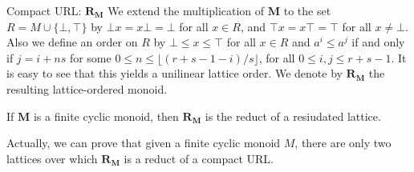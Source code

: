 \documentclass[professionalfont, 12pt]{beamer} %
\theoremstyle{plain}
\theoremstyle{definition}
\newcommand{\m}[1]{{\mathbf {#1} }}
\begin{document}
\begin{frame}{Compact URL: $\m R_{\m M}$}
    We extend the multiplication of $\m M$ to the set $R = M \cup \{\bot, \top\}$ by $\bot x = x \bot = \bot$ for all $x \in R$, and $\top x = x \top = \top$ for all $x \not = \bot$.
    Also we define an order on $R$ by $\bot \leq x \leq \top$ for all $x \in R$ and
    $a^i \leq a^j$ if and only if $j = i+ns$ for some $0 \leq n \leq \lfloor (r+s-1-i)/s \rfloor$, for all $0 \leq i, j \leq r+s-1$.
    It is easy to see that this yields a unilinear lattice order.
    We denote by $\m R_{\m M}$ the resulting lattice-ordered monoid.

    \begin{block}{}
        If $\m M$ is a finite cyclic monoid, then $\mathbf{R}_{\m M}$ is the reduct of a resiudated lattice.
    \end{block}
    \pause

    Actually, we can prove that given a finite cyclic monoid $M$, there are only two lattices over which $\m R_{\m M}$ is a reduct of a compact URL.
\end{frame}
\end{document}
